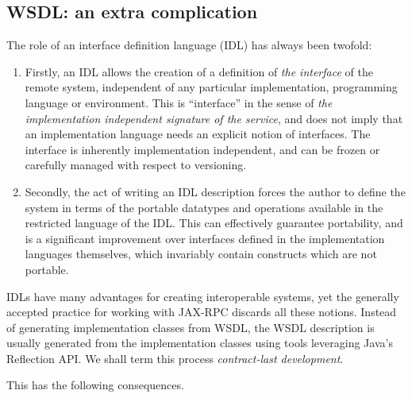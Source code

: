 \subsection{WSDL: an extra complication}
\label{objections:wsdl-gen}

The role of an interface definition language (IDL) has always been
twofold:

\begin{enumerate}
\item Firstly, an IDL allows the creation of a definition of \emph{the
interface} of the remote system, independent of any particular
implementation, programming language or environment. This is
``interface'' in the sense of \emph{the implementation independent
signature of the service}, and does not imply that an implementation
language needs an explicit notion of interfaces. The interface is
inherently implementation independent, and can be frozen or carefully
managed with respect to versioning.

\item Secondly, the act of writing an IDL description forces the author to
define the system in terms of the portable datatypes and operations available in
the restricted language of the IDL. This can effectively guarantee portability,
and is a significant improvement over interfaces defined in the implementation
languages themselves, which invariably contain constructs which are not
portable.

\end{enumerate}

IDLs have many advantages for creating interoperable systems, yet the
generally accepted practice for working with JAX-RPC discards all
these notions. Instead of generating implementation classes from WSDL,
the WSDL description is usually generated from the implementation
classes using tools leveraging Java's Reflection API. We shall term
this process \emph{contract-last development}.

This has the following consequences.

